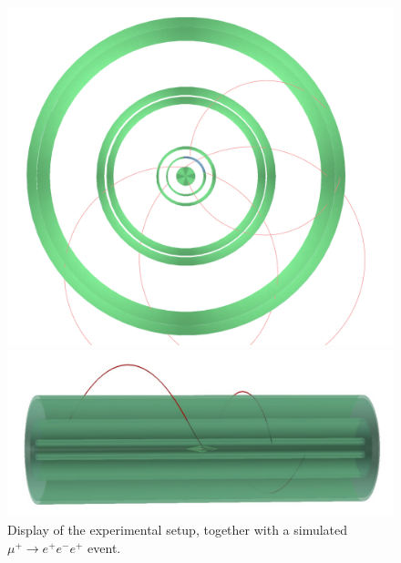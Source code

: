 \begin{figure}[htbp]
\begin{center}
\includegraphics[width=\textwidth]{Figures/mu3e-evt0.pdf}
\end{center}
\endminipage\hfill
{}
\begin{center}
\includegraphics[width=\textwidth]{Figures/mu3e-evt1.pdf}
\end{center}
\vspace{0.5cm}
\endminipage\hfill
\caption{Display of the experimental setup, together with a simulated $\mu^+ \rightarrow e^+e^-e^+$ event.}
\label{Fig::mu3e}
\end{figure}

